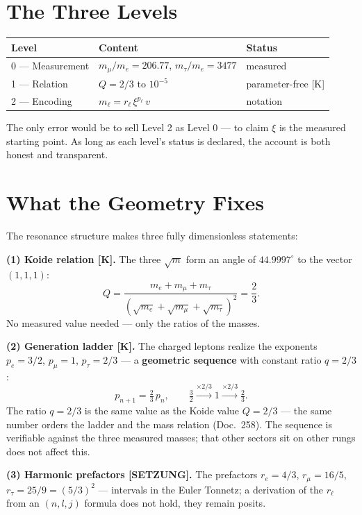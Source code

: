 \chapter{The Three Levels}

\begin{center}
\begin{tabular}{lll}
\toprule
Level & Content & Status \\
\midrule
0 — Measurement & $m_\mu/m_e = 206.77$, $m_\tau/m_e = 3477$ & measured \\
1 — Relation & $Q = 2/3$ to $10^{-5}$ & parameter-free [K] \\
2 — Encoding & $m_\ell = r_\ell\,\xi^{p_\ell}\,v$ & notation \\
\bottomrule
\end{tabular}
\end{center}

The only error would be to sell Level 2 as Level 0 — to claim $\xi$ is
the measured starting point. As long as each level's status is declared,
the account is both honest and transparent.

\chapter{What the Geometry Fixes}

The resonance structure makes three fully dimensionless statements:

\textbf{(1) Koide relation [K].} The three $\sqrt m$ form an angle of
$44.9997^\circ$ to the vector $(1,1,1)$:
\[
  Q = \frac{m_e + m_\mu + m_\tau}
           {(\sqrt{m_e}+\sqrt{m_\mu}+\sqrt{m_\tau})^2} = \frac{2}{3}.
\]
No measured value needed — only the ratios of the masses.

\textbf{(2) Generation ladder [K].} The charged leptons realize the
exponents $p_e = 3/2$, $p_\mu = 1$, $p_\tau = 2/3$ — a
\textbf{geometric sequence} with constant ratio $q = 2/3$:
\[
  p_{n+1} = \tfrac{2}{3}\,p_n, \qquad
  \tfrac{3}{2} \xrightarrow{\times 2/3} 1 \xrightarrow{\times 2/3} \tfrac{2}{3}.
\]
The ratio $q = 2/3$ is the same value as the Koide value
$Q = 2/3$ — the same number orders the ladder and the mass relation
(Doc.~258). The sequence is verifiable against the three measured
masses; that other sectors sit on other rungs does not affect this.

\textbf{(3) Harmonic prefactors [SETZUNG].} The prefactors $r_e = 4/3$,
$r_\mu = 16/5$, $r_\tau = 25/9 = (5/3)^2$ — intervals in the Euler
Tonnetz; a derivation of the $r_\ell$ from an $(n,l,j)$ formula does not
hold, they remain posits.

